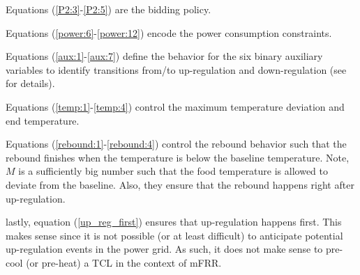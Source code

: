 {Equations (\ref{P2:3}-\ref{P2:5}) are the bidding policy.

Equations (\ref{power:6}-\ref{power:12}) encode the power consumption constraints.

Equations (\ref{aux:1}-\ref{aux:7}) define the behavior for the six binary auxiliary variables to identify transitions from/to up-regulation and down-regulation (see \cite{morales2013integrating} for details).

Equations (\ref{temp:1}-\ref{temp:4}) control the maximum temperature deviation and end temperature.

Equations (\ref{rebound:1}-\ref{rebound:4}) control the rebound behavior such that the rebound finishes when the temperature is below the baseline temperature. Note, $M$ is a sufficiently big number such that the food temperature is allowed to deviate from the baseline. Also, they ensure that the rebound happens right after up-regulation.

lastly, equation (\ref{up_reg_first}) ensures that up-regulation happens first. This makes sense since it is not possible (or at least difficult) to anticipate potential up-regulation events in the power grid. As such, it does not make sense to pre-cool (or pre-heat) a TCL in the context of mFRR.



}
